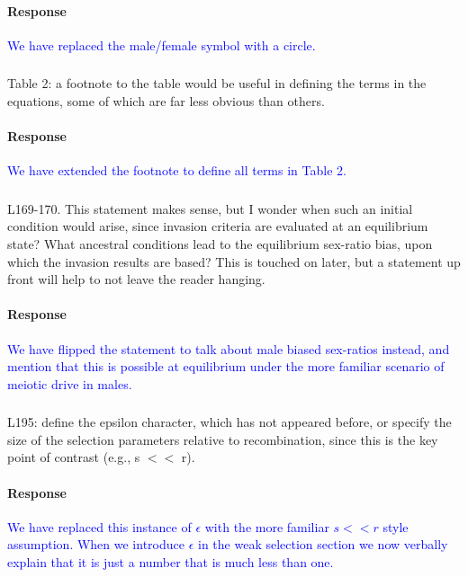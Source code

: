 \documentclass[10pt,letterpaper]{article}
\begin{document}
\noindent\paragraph{Response}
\textcolor{blue}{We have replaced the male/female symbol with a circle.}

\noindent\subsubsection{}
Table 2: a footnote to the table would be useful in defining the terms in the equations, some of which are far less obvious than others.

\noindent\paragraph{Response}
\textcolor{blue}{We have extended the footnote to define all terms in Table 2.}

\noindent\subsubsection{}
L169-170. This statement makes sense, but I wonder when such an initial condition would arise, since invasion criteria are evaluated at an equilibrium state? What ancestral conditions lead to the equilibrium sex-ratio bias, upon which the invasion results are based? This is touched on later, but a statement up front will help to not leave the reader hanging.

\noindent\paragraph{Response}
\textcolor{blue}{We have flipped the statement to talk about male biased sex-ratios instead, and mention that this is possible at equilibrium under the more familiar scenario of meiotic drive in males.}

\noindent\subsubsection{}
L195: define the epsilon character, which has not appeared before, or specify the size of the selection parameters relative to recombination, since this is the key point of contrast (e.g., s $<<$ r).

\noindent\paragraph{Response}
\textcolor{blue}{We have replaced this instance of $\epsilon$ with the more familiar $s<<r$ style assumption. When we introduce $\epsilon$ in the weak selection section we now verbally explain that it is just a number that is much less than one.}
\end{document}
